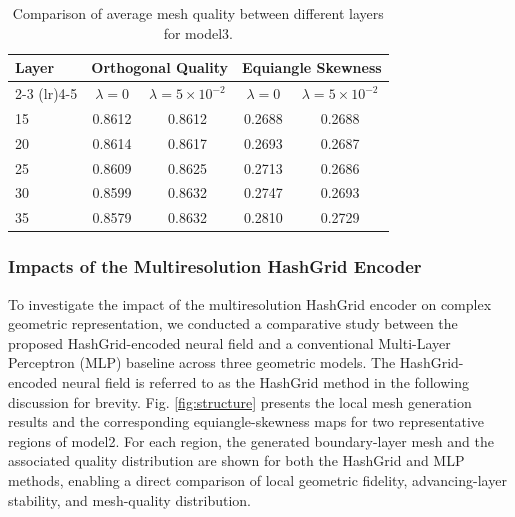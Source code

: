 \documentclass[%
 aip,
 amsmath,amssymb,
 reprint,%
nobibnotes,
]{revtex4-1}
\begin{document}
\begin{table}[hbt]
    \centering
    \caption{Comparison of average mesh quality between different layers for model3.}
    \label{tab:ablation_study:pdeloss}
    \renewcommand{\arraystretch}{1.2}
    \begin{tabular}{l c c c c}
        \toprule
        \multirow{2}{*}{\textbf{Layer}} & \multicolumn{2}{c}{\textbf{Orthogonal Quality}} & \multicolumn{2}{c}{\textbf{Equiangle Skewness}}\\
        \cmidrule(lr){2-3} \cmidrule(lr){4-5}
        & $\lambda=0$ & $\lambda=5 \times 10^{-2}$ & $\lambda=0$ & $\lambda=5 \times 10^{-2}$\\
        \midrule
        15    &0.8612&0.8612&0.2688&0.2688\\
        20    &0.8614&0.8617&0.2693&0.2687\\
        25    &0.8609&0.8625&0.2713&0.2686\\
        30    &0.8599&0.8632&0.2747&0.2693\\
        35    &0.8579&0.8632&0.2810&0.2729\\
        \bottomrule
    \end{tabular}
\end{table}

\subsubsection{\label{sec:level3-3}Impacts of the Multiresolution HashGrid Encoder}

To investigate the impact of the multiresolution HashGrid encoder on complex geometric representation, we conducted a comparative study between the proposed HashGrid-encoded neural field and a conventional Multi-Layer Perceptron (MLP) baseline across three geometric models. The HashGrid-encoded neural field is referred to as the HashGrid method in the following discussion for brevity. Fig. \ref{fig:structure} presents the local mesh generation results and the corresponding equiangle-skewness maps for two representative regions of model2. For each region, the generated boundary-layer mesh and the associated quality distribution are shown for both the HashGrid and MLP methods, enabling a direct comparison of local geometric fidelity, advancing-layer stability, and mesh-quality distribution.
\end{document}

